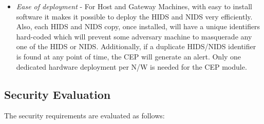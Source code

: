 \documentclass[conference]{sig-alternate-05-2015}
\begin{document}
\begin{itemize}
  \item \textit{Ease of deployment} - For Host and Gateway Machines, with easy to install software it makes it possible to deploy the HIDS and NIDS very efficiently. Also, each HIDS and NIDS copy, once installed, will have a unique identifiers hard-coded which will prevent some adversary machine to masquerade any one of the HIDS or NIDS. Additionally, if a duplicate HIDS/NIDS identifier is found at any point of time, the CEP will generate an alert. Only one dedicated hardware deployment per N/W is needed for the CEP module.
\end{itemize}

\subsection{Security Evaluation}
The security requirements are evaluated as follows:
\end{document}
